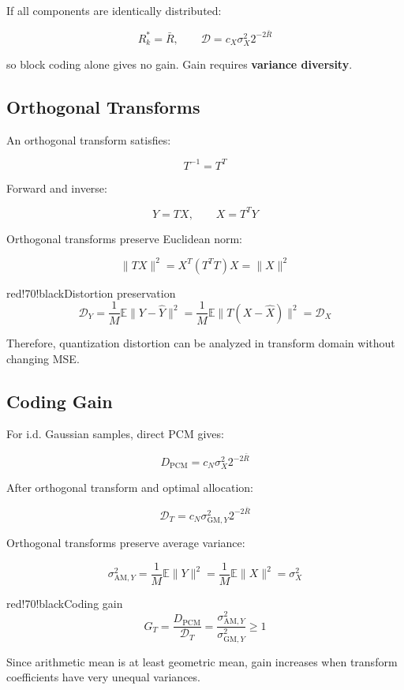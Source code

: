 If all components are identically distributed:

\[
R_k^*=\bar{R},
\qquad
\mathcal{D}=c_X\sigma_X^2 2^{-2\bar{R}}
\]

so block coding alone gives no gain. Gain requires \textbf{variance diversity}.

\subsection{Orthogonal Transforms}

An orthogonal transform satisfies:

\[
T^{-1}=T^T
\]

Forward and inverse:

\[
Y=TX,\qquad X=T^TY
\]

Orthogonal transforms preserve Euclidean norm:

\[
\|TX\|^2=X^T(T^TT)X=\|X\|^2
\]

\begin{calloutbox}{red!70!black}{Distortion preservation}
\[
\mathcal{D}_Y
=
\frac{1}{M}\mathbb{E}\|Y-\hat{Y}\|^2
=
\frac{1}{M}\mathbb{E}\|T(X-\hat{X})\|^2
=
\mathcal{D}_X
\]

Therefore, quantization distortion can be analyzed in transform domain without changing MSE.
\end{calloutbox}

\subsection{Coding Gain}

For i.d. Gaussian samples, direct PCM gives:

\[
D_{\text{PCM}}=c_N\sigma_X^2 2^{-2\bar{R}}
\]

After orthogonal transform and optimal allocation:

\[
\mathcal{D}_T=c_N\sigma_{\text{GM},Y}^2 2^{-2\bar{R}}
\]

Orthogonal transforms preserve average variance:

\[
\sigma_{\text{AM},Y}^2
=
\frac{1}{M}\mathbb{E}\|Y\|^2
=
\frac{1}{M}\mathbb{E}\|X\|^2
=\sigma_X^2
\]

\begin{calloutbox}{red!70!black}{Coding gain}
\[
G_T
=
\frac{D_{\text{PCM}}}{\mathcal{D}_T}
=
\frac{\sigma_{\text{AM},Y}^2}
{\sigma_{\text{GM},Y}^2}
\geq 1
\]

Since arithmetic mean is at least geometric mean, gain increases when transform coefficients have very unequal variances.
\end{calloutbox}

